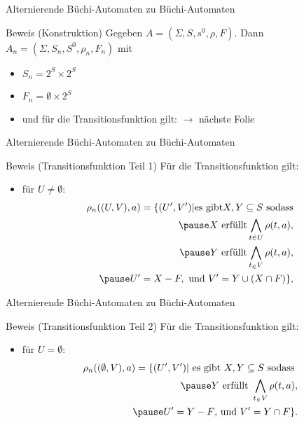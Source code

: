 \begin{frame}{Alternierende Büchi-Automaten zu Büchi-Automaten}
\begin{block}{Beweis (Konstruktion) \cite{vardi+96}}
Gegeben $A=(\Sigma,S, s^0, \rho, F)$. Dann $A_n=(\Sigma,S_n,S^0,\rho_n,F_n)$ mit
\pause
\begin{itemize}
\setlength\itemsep{1em}
\item $S_n=2^S\times 2^S$
\pause
\item $F_n=\emptyset\times 2^S$
\pause
\item und für die Transitionsfunktion gilt: $\rightarrow$ nächste Folie
\end{itemize}
\end{block}
\end{frame}

\begin{frame}{Alternierende Büchi-Automaten zu Büchi-Automaten}
\begin{block}{Beweis (Transitionsfunktion Teil 1) \cite{vardi+96}}
Für die Transitionsfunktion gilt:
\begin{itemize}
\setlength\itemsep{1em}
\item für $U\neq\emptyset$:
\begin{align*}
\rho_n((U,V),a)=\{(U',V')| \text{es gibt} X,Y\subseteq S\text{ sodass}&\\
\pause
X \text{ erfüllt} \bigwedge_{t \in U}\rho(t,a),\\
\pause
Y \text{ erfüllt} \bigwedge_{t_\in V}\rho(t,a),\\
\pause
U'=X-F, \text{ und } V'=Y\cup(X\cap F)\},
\end{align*}
\end{itemize}
\end{block}
\end{frame}

\begin{frame}{Alternierende Büchi-Automaten zu Büchi-Automaten}
\begin{block}{Beweis (Transitionsfunktion Teil 2) \cite{vardi+96}}
Für die Transitionsfunktion gilt:
\begin{itemize}
\item für $U=\emptyset$:
\begin{align*}
\rho_n((\emptyset,V),a)=\{(U',V')|\text{ es gibt } X,Y\subseteq S \text{ sodass }\\
\pause
Y \text{ erfüllt } \bigwedge_{t_\in V}\rho(t,a),\\
\pause
U'=Y-F\text{, und } V'=Y\cap F\}.
\end{align*}
\end{itemize}
\end{block}
\end{frame}

